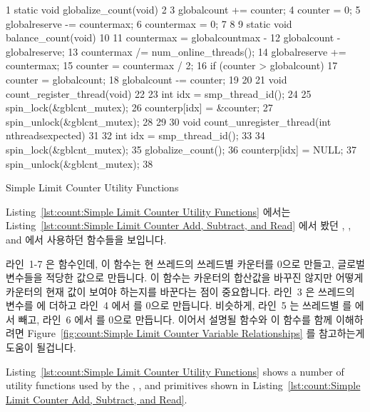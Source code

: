 \begin{listing}[tbp]
{ \scriptsize
\begin{verbbox}
  1 static void globalize_count(void)
  2 {
  3   globalcount += counter;
  4   counter = 0;
  5   globalreserve -= countermax;
  6   countermax = 0;
  7 }
  8 
  9 static void balance_count(void)
 10 {
 11   countermax = globalcountmax -
 12                globalcount - globalreserve;
 13   countermax /= num_online_threads();
 14   globalreserve += countermax;
 15   counter = countermax / 2;
 16   if (counter > globalcount)
 17     counter = globalcount;
 18   globalcount -= counter;
 19 }
 20 
 21 void count_register_thread(void)
 22 {
 23   int idx = smp_thread_id();
 24 
 25   spin_lock(&gblcnt_mutex);
 26   counterp[idx] = &counter;
 27   spin_unlock(&gblcnt_mutex);
 28 }
 29 
 30 void count_unregister_thread(int nthreadsexpected)
 31 {
 32   int idx = smp_thread_id();
 33 
 34   spin_lock(&gblcnt_mutex);
 35   globalize_count();
 36   counterp[idx] = NULL;
 37   spin_unlock(&gblcnt_mutex);
 38 }
\end{verbbox}
}
\centering
\theverbbox
\caption{Simple Limit Counter Utility Functions}
\label{lst:count:Simple Limit Counter Utility Functions}
\end{listing}

Listing~\ref{lst:count:Simple Limit Counter Utility Functions} 에서는
Listing~\ref{lst:count:Simple Limit Counter Add, Subtract, and Read} 에서 봤던 
, , and  에서 사용하던
함수들을 보입니다.

라인~1-7 은  함수인데, 이 함수는 현 쓰레드의 쓰레드별
카운터를 0으로 만들고, 글로벌 변수들을 적당한 값으로 만듭니다.
이 함수는 카운터의 합산값을 바꾸진 않지만 어떻게 카운터의 현재 값이 보여야
하는지를 바꾼다는 점이 중요합니다.
라인~3 은 쓰레드의  변수를  에 더하고 라인~4 에서
 를 0으로 만듭니다.
비슷하게, 라인~5 는 쓰레드별  를  에서 빼고,
라인~6 에서  를 0으로 만듭니다.
이어서 설명될  함수와 이 함수를 함께 이해하려면
Figure~\ref{fig:count:Simple Limit Counter Variable Relationships}
를 참고하는게 도움이 될겁니다.
\iffalse

Listing~\ref{lst:count:Simple Limit Counter Utility Functions}
shows a number of utility functions used by the ,
, and  primitives shown in
Listing~\ref{lst:count:Simple Limit Counter Add, Subtract, and Read}.

